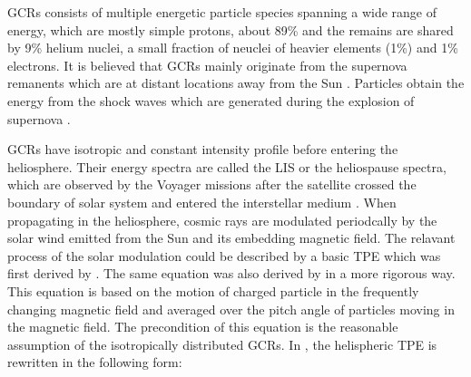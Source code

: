 \acp{GCR} consists of multiple energetic particle species spanning a wide range of energy, which are mostly simple protons, about 89\% and the remains are shared by 9\% helium nuclei, a small fraction of neuclei of heavier elements (1\%) and 1\% electrons. %
It is believed that \acp{GCR} mainly originate from the supernova remanents which are at distant locations away from the Sun \citep{Blasi2013AARv2013,Bhattacarjee2000PhR,Fermi1949PhRv}. Particles obtain the energy from the shock waves which are generated during the explosion of supernova \citep{blandford1978particle}.


\acp{GCR} have isotropic and constant intensity profile before entering the heliosphere. Their energy spectra are called the \ac{LIS} or the heliospause spectra, which are observed by the Voyager missions after the satellite crossed the boundary of solar system and entered the interstellar medium \citep{Stone2013Sci, Cummings2016ApJ,Stone2019NatAs}.
When propagating in the heliosphere, cosmic rays are modulated periodcally by the solar wind emitted from the Sun and its embedding magnetic field. The relavant process of the solar modulation could be described by a basic \ac{TPE} which was first derived by \citet{Parker1965Pss}. The same equation was also derived by \citet{Gleeson1967ApJ} in a more rigorous way. This equation is based on the motion of charged particle in the frequently changing magnetic field and averaged over the pitch angle of particles moving in the magnetic field. The precondition of this equation is the reasonable assumption of the isotropically distributed \acp{GCR}. 
In \citet{Potgieter2013LRSP}, the helispheric \ac{TPE} is rewritten in the following form:

